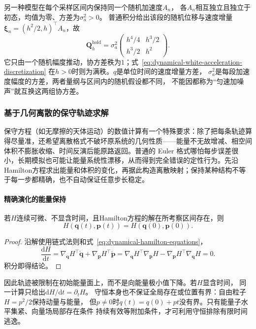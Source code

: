 另一种模型在每个采样区间内保持同一个随机加速度$A_n$，
各$A_n$相互独立且独立于初态，均值为零、方差为$\sigma_a^2>0$。
普通积分给出该段的随机位移与速度增量
$\bm\xi_n=(h^2/2,h)^\top A_n$，故
\begin{equation}
 \bm Q_h^{\mathrm{hold}}
   =\sigma_a^2\begin{pmatrix}h^4/4&h^3/2\\h^3/2&h^2\end{pmatrix}.
 \label{eq:dynamical-held-acceleration-covariance}
\end{equation}
它只由一个随机幅度推动，协方差秩为$1$；式~\eqref{eq:dynamical-white-acceleration-discretization}
在$h>0$时则为满秩。$q$是单位时间的速度增量方差，
$\sigma_a^2$是每段加速度幅度的方差，两者量纲与区间内的随机假设都不同，
不能因都称为“匀速加噪声”就互换这两组协方差。

\subsubsection{基于几何离散的保守轨迹求解}
\label{sec:dynamical-hamiltonian-geometric-integration}
保守方程（如无摩擦的天体运动）的数值计算有一个特殊要求：除了把每条轨迹算得尽量准，还希望离散格式不破坏原系统的几何性质——能量不无故增减、相空间体积不膨胀收缩、时间反演后能原路返回。普通的 Euler 格式哪怕每步误差很小，长期模拟也可能让能量系统性漂移，从而得到完全错误的定性行为。先沿Hamilton方程求出能量和体积的变化，再据此构造离散映射；保持某种结构不等于每一步都精确，也不自动保证任意步长稳定。

\paragraph{精确演化的能量保持}
\begin{theorem}[Hamilton能量守恒]
  \label{thm:dynamical-hamiltonian-energy-conservation}
  若$H$连续可微、不显含时间，且Hamilton方程的解在所考察区间存在，则
  \[
    H(\bm q(t),\bm p(t))=H(\bm q(0),\bm p(0)).
  \]
\end{theorem}
\begin{proof}
  沿解使用链式法则和式~\eqref{eq:dynamical-hamilton-equations}，
  \[
    \frac{\mathrm dH}{\mathrm dt}
    =\nabla_{\bm q}H^\top\dot{\bm q}
      +\nabla_{\bm p}H^\top\dot{\bm p}
    =\nabla_{\bm q}H^\top\nabla_{\bm p}H
      -\nabla_{\bm p}H^\top\nabla_{\bm q}H=0.
  \]
  积分即得结论。
\end{proof}
因此轨迹被限制在初始能量面上，而不是向能量极小值下降。若$H$显含时间，
同一计算只给出$\mathrm dH/\mathrm dt=\partial_tH$。
守恒本身也不保证全局存在或位置有界：自由粒子$H=p^2/2$保持动量与能量，
但$p\neq0$时$q(t)=q(0)+pt$没有界。只有能量子水平集紧、向量场局部存在条件
持续有效等附加条件，才可利用守恒排除有限时间逃逸。

